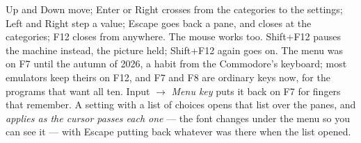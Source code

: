 Up and Down move; Enter or Right crosses from the categories to the
settings; Left and Right step a value; Escape goes back a pane, and
closes at the categories; F12 closes from anywhere. The mouse works too.
Shift+F12 pauses the machine instead, the picture held; Shift+F12 again
goes on. The menu was on F7 until the autumn of 2026, a habit from the
Commodore's keyboard; most emulators keep theirs on F12, and F7 and F8
are ordinary keys now, for the programs that want all ten. Input
$\rightarrow$ \emph{Menu key} puts it back on F7 for fingers that
remember.
A setting with a list of choices opens that list over the panes, and
\emph{applies as the cursor passes each one} --- the font changes
under the menu so you can see it --- with Escape putting back whatever
was there when the list opened.


